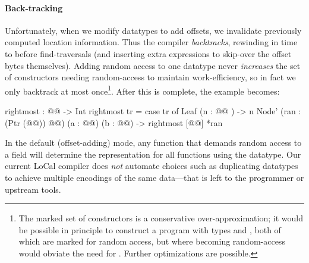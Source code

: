 
\paragraph{Back-tracking}
%
Unfortunately, when we modify datatypes to add offsets, we invalidate
previously computed location information.  Thus the compiler {\em backtracks},
rewinding in time to before find-traversals (and inserting extra 
expressions to skip-over the offset bytes themselves).
%
Adding random access to one datatype never \emph{increases} the set of
constructors needing random-access to maintain work-efficiency, so in fact we
only backtrack at most once\footnote{The marked set of constructors
  is a conservative over-approximation; it would be possible in principle to
  construct a program with types  and , both of which are marked for
  random access, but where  becoming random-access would obviate the need
  for .  Further optimizations are possible.}.
%
%
After this is complete, the  example becomes:
%
\begin{code}
rightmost : @@ -> Int
rightmost tr =
 case tr of
   Leaf (n : @@ ) -> n
   Node' (ran : (Ptr (@@)) @@)
         (a : @@) (b : @@)
      -> rightmost [@@] *ran
\end{code}


%
In the default (offset-adding) mode, any function that demands random access to
a field will determine the representation for all functions using the
datatype.
%
Our current LoCal compiler does \emph{not} automate choices such as duplicating
datatypes to achieve multiple encodings of the same data---that is left to the
programmer or upstream tools.

